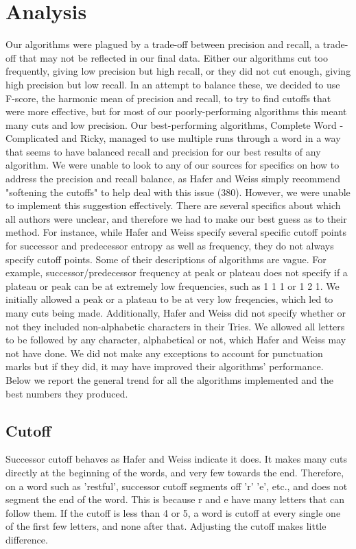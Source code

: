 \documentclass[11pt,letterpaper]{article}
\begin{document}
\section{Analysis}
  Our algorithms were plagued by a trade-off between precision and recall, a trade-off that may not be reflected in our final data. Either our algorithms cut too frequently, giving low precision but high recall, or they did not cut enough, giving high precision but low recall. In an attempt to balance these, we decided to use F-score, the harmonic mean of precision and recall, to try to find cutoffs that were more effective, but for most of our poorly-performing algorithms this meant many cuts and low precision. 
  Our best-performing algorithms, Complete Word - Complicated and Ricky, managed to use multiple runs through a word in a way that seems to have balanced recall and precision for our best results of any algorithm. 
  We were unable to look to any of our sources for specifics on how to address the precision and recall balance, as Hafer and Weiss simply recommend "softening the cutoffs" to help deal with this issue (380). However, we were unable to implement this suggestion effectively. 
    There are several specifics about which all authors were unclear, and therefore we had to make our best guess as to their method. For instance, while Hafer and Weiss specify several specific cutoff points for successor and predecessor entropy as well as frequency, they do not always specify cutoff points. Some of their descriptions of algorithms are vague. For example, successor/predecessor frequency at peak or plateau does not specify if a plateau or peak can be at extremely low frequencies, such as 1 1 1 or 1 2 1. We initially allowed a peak or a plateau to be at very low freqencies, which led to many cuts being made. Additionally, Hafer and Weiss did not specify whether or not they included non-alphabetic characters in their Tries. We allowed all letters to be followed by any character, alphabetical or not, which Hafer and Weiss may not have done. We did not make any exceptions to account for punctuation marks but if they did, it may have improved their algorithms' performance. 
    Below we report the general trend for all the algorithms implemented and the best numbers they produced. 
    
\subsection{Cutoff} 

  Successor cutoff behaves as Hafer and Weiss indicate it does. It makes many cuts directly at the beginning of the words, and very few towards the end. Therefore, on a word such as 'restful', successor cutoff segments off 'r' 'e', etc., and does not segment the end of the word. This is because r and e have many letters that can follow them. If the cutoff is less than 4 or 5, a word is cutoff at every single one of the first few letters, and none after that. Adjusting the cutoff makes little difference.
    
\end{document}
